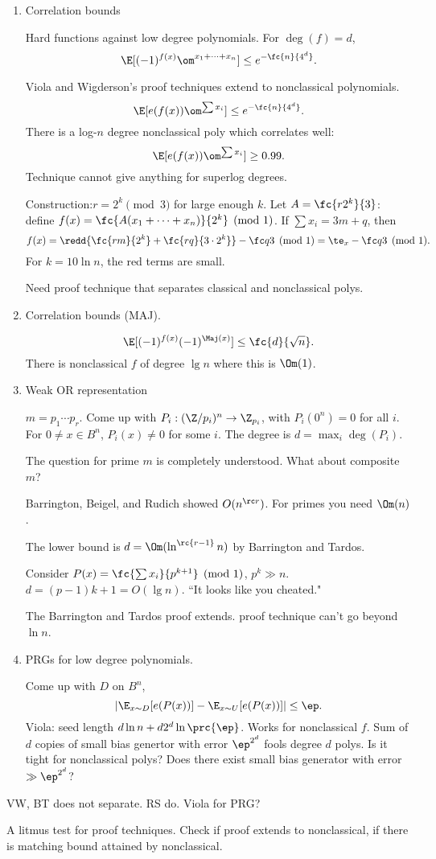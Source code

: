 \begin{enumerate}
\item
Correlation bounds

Hard functions against low degree polynomials. For $\deg (f)=d$,
\[
\E[(-1)^{f(x)} \om^{x_1+\cdots +x_n}] \le e^{-\fc{n}{4^d}}.
\]

Viola and Wigderson's proof techniques extend to nonclassical polynomials. 
\[
\E[e(f(x))\om^{\sum x_i}]\le  e^{-\fc{n}{4^d}}.
\]
There is a log-$n$ degree nonclassical poly which correlates well:
\[
\E[e(f(x))\om^{\sum x_i}]\ge 0.99.
\]
Technique cannot give anything for superlog degrees.

Construction:$r=2^k\pmod 3$ for large enough $k$. Let $A=\fc{r2^k}{3}$: define $f(x)=\fc{A(x_1+\cdots +x_n)}{2^k}\pmod 1$. If $\sum x_i=3m+q$, then 
\[
f(x) = \redd{\fc{rm}{2^k}+\fc{rq}{3\cdot 2^k}} - \fc q3\pmod 1 = \te_x-\fc q3\pmod 1.
\]
For $k=10\ln n$, the red terms are small.

Need proof technique that separates classical and nonclassical polys.
\item
Correlation bounds (MAJ).

\[
\E[(-1)^{f(x)}(-1)^{\Maj(x)}]\le \fc{d}{\sqrt n}.
\]
There is nonclassical $f$ of degree $\lg n$ where this is $\Om(1)$.
\item
Weak OR representation

$m=p_1\cdots p_r$. Come up with $P_i:(\Z/p_i)^n\to \Z_{p_i}$, with $P_i(0^n)=0$ for all $i$. For $0\ne x\in B^n$, $P_i(x)\ne 0$ for some $i$. The degree is $d=\max_i\deg(P_i)$.

The question for prime $m$ is completely understood. What about composite $m$?

Barrington, Beigel, and Rudich showed $O(n^{\rc r})$. For primes you need $\Om(n)$.

The lower bound is $d=\Om(\ln^{\rc{r-1}}n)$ by Barrington and Tardos.

Consider $P(x) = \fc{\sum x_i}{p^{k+1}}\pmod 1$, $p^k\gg n$. $d=(p-1)k+1=O(\lg n)$. ``It looks like you cheated."

The Barrington and Tardos proof extends. proof technique can't go beyond $\ln n$.
\item
PRGs for low degree polynomials.

Come up with $D$ on $B^n$, 
\[
|\E_{x\sim D} [e(P(x))] - \E_{x\sim U} [e(P(x))]|\le \ep.
\]
Viola: seed length $d\ln n + d2^d \ln \prc{\ep}$. Works for nonclassical $f$. Sum of $d$ copies of small bias genertor with error $\ep^{2^d}$ fools degree $d$ polys. Is it tight for nonclassical polys? Does there exist small bias generator with error $\gg \ep^{2^d}$?
\end{enumerate}
VW, BT does not separate. RS do. Viola for PRG?

A litmus test for proof techniques. Check if proof extends to nonclassical, if there is matching bound attained by nonclassical.